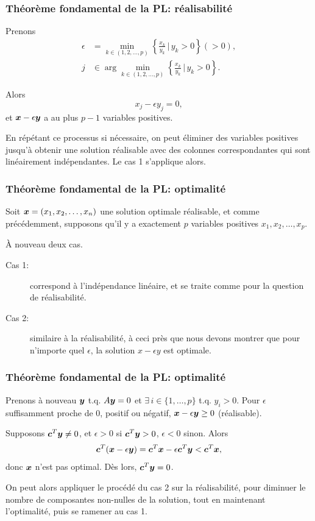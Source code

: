 \documentclass[usepdftitle=false]{beamer}
\begin{document}
\begin{frame}
\frametitle{Théorème fondamental de la PL: réalisabilité}

Prenons
\begin{align*}
\epsilon &= \min_{k \in (1,2,\ldots,p)} \left\lbrace \frac{x_k}{y_k} \,\bigg|\, y_k > 0 \right\rbrace (> 0), \\
j &\in \arg \min_{k \in (1,2,\ldots,p)} \left\lbrace \frac{x_k}{y_k} \,\bigg|\, y_k > 0 \right\rbrace.
\end{align*}

Alors
$$
x_j - \epsilon y_j = 0,
$$
et ${\boldsymbol{x}} - \epsilon{\boldsymbol{y}}$ a au plus $p-1$ variables positives.

\mbox{}

En répétant ce processus si nécessaire, on peut éliminer des variables positives jusqu'à obtenir une solution réalisable avec des colonnes correspondantes qui sont linéairement indépendantes. Le cas 1 s'applique alors.

\end{frame}

\begin{frame}
\frametitle{Théorème fondamental de la PL: optimalité}

Soit ${\boldsymbol{x}} = (x_1, x_2, \ldots, x_n)$ une solution optimale réalisable, et comme précédemment, supposons qu'il y a exactement $p$ variables positives $x_1, x_2, \ldots, x_p$.

\mbox{}

À nouveau deux cas.
\begin{description}
\item[Cas 1:] correspond à l'indépendance linéaire, et se traite comme pour la question de réalisabilité.
\item[Cas 2:]
similaire à la réalisabilité, à ceci près que nous devons montrer que pour n'importe quel $\epsilon$, la solution $x-\epsilon y$ est optimale.
\end{description}

\end{frame}

\begin{frame}
\frametitle{Théorème fondamental de la PL: optimalité}

Prenons à nouveau ${\boldsymbol{y}}$ t.q. $A{\boldsymbol{y}} = 0$ et $\exists\, i \in \{1,\ldots,p\}$ t.q. $y_i > 0$.
Pour $\epsilon$ suffisamment proche de 0, positif ou négatif, ${\boldsymbol{x}} - \epsilon {\boldsymbol{y}} \geq 0$ (réalisable).

\mbox{}

Supposons ${\boldsymbol{c}}^T{\boldsymbol{y}} \ne 0$, et $\epsilon > 0$ si ${\boldsymbol{c}}^T{\boldsymbol{y}} > 0$, $\epsilon < 0$ sinon. Alors
$$
{\boldsymbol{c}}^T({\boldsymbol{x}} - \epsilon {\boldsymbol{y}}) = {\boldsymbol{c}}^T {\boldsymbol{x}} - \epsilon {\boldsymbol{c}}^T{\boldsymbol{y}} < {\boldsymbol{c}}^T {\boldsymbol{x}},
$$
donc ${\boldsymbol{x}}$ n'est pas optimal.
Dès lors, ${\boldsymbol{c}}^T{\boldsymbol{y}} = 0$.

\mbox{}

On peut alors appliquer le procédé du cas 2 sur la réalisabilité, pour diminuer le nombre de composantes non-nulles de la solution, tout en maintenant l'optimalité, puis se ramener au cas 1.

\end{frame}
\end{document}

